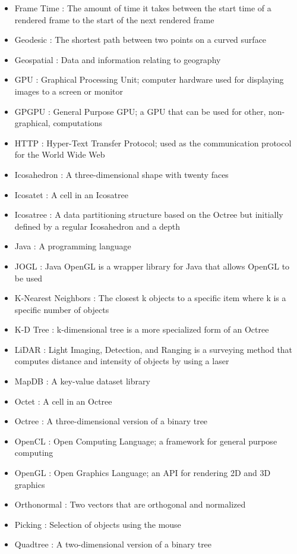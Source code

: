 \begin{itemize}
   \item Frame Time : The amount of time it takes between the start time of a rendered frame to the start of the next rendered frame
   \item Geodesic : The shortest path between two points on a curved surface
   \item Geospatial : Data and information relating to geography
   \item GPU : Graphical Processing Unit; computer hardware used for displaying images to a screen or monitor
   \item GPGPU : General Purpose GPU; a GPU that can be used for other, non-graphical, computations
   \item HTTP : Hyper-Text Transfer Protocol; used as the communication protocol for the World Wide Web
   \item Icosahedron : A three-dimensional shape with twenty faces
   \item Icosatet : A cell in an Icosatree
   \item Icosatree : A data partitioning structure based on the Octree but initially defined by a regular Icosahedron and a depth
   \item Java : A programming language
   \item JOGL : Java OpenGL is a wrapper library for Java that allows OpenGL to be used
   \item K-Nearest Neighbors : The closest k objects to a specific item where k is a specific number of objects
   \item K-D Tree : k-dimensional tree is a more specialized form of an Octree
   \item LiDAR : Light Imaging, Detection, and Ranging is a surveying method that computes distance and intensity of objects by using a laser
   \item MapDB : A key-value dataset library
   \item Octet : A cell in an Octree
   \item Octree : A three-dimensional version of a binary tree
   \item OpenCL : Open Computing Language; a framework for general purpose computing
   \item OpenGL : Open Graphics Language; an API for rendering 2D and 3D graphics
   \item Orthonormal : Two vectors that are orthogonal and normalized
   \item Picking : Selection of objects using the mouse
   \item Quadtree : A two-dimensional version of a binary tree

\end{itemize}
